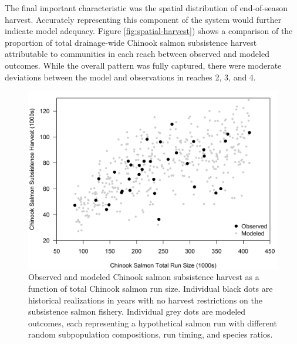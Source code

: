 \documentclass[12pt,]{book}
\theoremstyle{definition}
\theoremstyle{definition}
\theoremstyle{definition}
\theoremstyle{remark}
\begin{document}
The final important characteristic was the spatial distribution of
end-of-season harvest. Accurately representing this component of the
system would further indicate model adequacy. Figure
\ref{fig:spatial-harvest}) shows a comparison of the proportion of total
drainage-wide Chinook salmon subsistence harvest attributable to
communities in each reach between observed and modeled outcomes. While
the overall pattern was fully captured, there were moderate deviations
between the model and observations in reaches 2, 3, and 4.

\clearpage

\begin{figure}
  \centering
  \includegraphics{img/Ch3/FigureB1_noline.jpg}
  \caption{Observed and modeled Chinook salmon subsistence harvest as a function of total Chinook salmon run size. Individual black dots are historical realizations in years with no harvest restrictions on the subsistence salmon fishery. Individual grey dots are modeled outcomes, each representing a hypothetical salmon run with different random subpopulation compositions, run timing, and species ratios.}
  \label{fig:HvN}
\end{figure}

\clearpage
\end{document}
